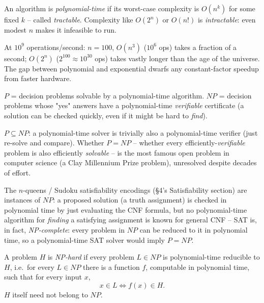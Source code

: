 \documentclass[11pt]{article}
\begin{document}
\bigskip
\begin{definition}
An algorithm is \emph{polynomial-time} if its worst-case complexity is $O(n^k)$ for some fixed $k$ -- called \emph{tractable}. Complexity like $O(2^n)$ or $O(n!)$ is \emph{intractable}: even modest $n$ makes it infeasible to run.
\end{definition}

\begin{example}
At $10^9$ operations/second: $n=100$, $O(n^3)$ ($10^6$ ops) takes a fraction of a second; $O(2^n)$ ($2^{100}\approx10^{30}$ ops) takes vastly longer than the age of the universe. The gap between polynomial and exponential dwarfs any constant-factor speedup from faster hardware.
\end{example}

\bigskip
\begin{definition}
$P$ = decision problems solvable by a polynomial-time algorithm. $NP$ = decision problems whose "yes" answers have a polynomial-time \emph{verifiable} certificate (a solution can be checked quickly, even if it might be hard to \emph{find}).
\end{definition}

\begin{note}
$P\subseteq NP$: a polynomial-time solver is trivially also a polynomial-time verifier (just re-solve and compare). Whether $P=NP$ -- whether every efficiently-\emph{verifiable} problem is also efficiently \emph{solvable} -- is the most famous open problem in computer science (a Clay Millennium Prize problem), unresolved despite decades of effort.
\end{note}

\begin{note}
The $n$-queens / Sudoku satisfiability encodings (\S4's Satisfiability section) are instances of $NP$: a proposed solution (a truth assignment) is checked in polynomial time by just evaluating the CNF formula, but no polynomial-time algorithm for \emph{finding} a satisfying assignment is known for general CNF -- SAT is, in fact, \emph{NP-complete}: every problem in $NP$ can be reduced to it in polynomial time, so a polynomial-time SAT solver would imply $P=NP$.
\end{note}

\begin{definition}
A problem $H$ is \emph{NP-hard} if every problem $L\in NP$ is polynomial-time reducible to $H$, i.e.\ for every $L\in NP$ there is a function $f$, computable in polynomial time, such that for every input $x$,
\[
x\in L \iff f(x)\in H.
\]
$H$ itself need not belong to $NP$.
\end{definition}
\end{document}
